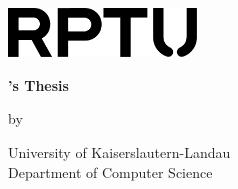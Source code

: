 \documentclass[
	bibliography=totoc, %
	listof=totoc,      %
]{scrbook}              %
\begin{document}
\frontmatter


\begin{titlepage}
    \makeatletter
        \centering
        \includegraphics[width=5cm]{RPTU Logo_minimal_1cschwarz}\par\vspace*{\fill}
        {\scshape\huge\sffamily \@title \par}\vspace*{\fill}
        {\Large\bfseries \thesisType's Thesis\par} \vspace{1cm}
        {\Large by\par} \vspace{1cm}
        {\LARGE\@author\par}\vspace{1cm}
        {\Large \@date \par}\vspace*{\fill}
        {\Large University of Kaiserslautern-Landau\\
        \Large Department of Computer Science\par}
    \makeatother
\end{titlepage}
\restoregeometry

\end{document}
